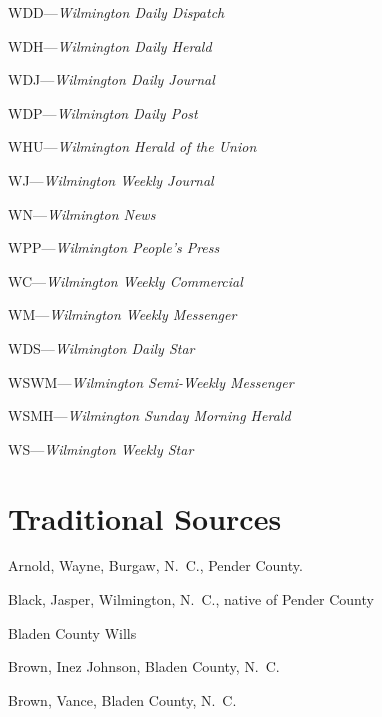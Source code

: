 \documentclass[11pt, a5paper, openright]{book}
\begin{document}
\begin{thebibliography}{99}
  WDD---\emph{Wilmington Daily Dispatch}

  WDH---\emph{Wilmington Daily Herald}

  WDJ---\emph{Wilmington Daily Journal}

  WDP---\emph{Wilmington Daily Post}

  WHU---\emph{Wilmington Herald of the Union}

  WJ---\emph{Wilmington Weekly Journal}

  WN---\emph{Wilmington News}

  WPP---\emph{Wilmington People's Press}

  WC---\emph{Wilmington Weekly Commercial}

  WM---\emph{Wilmington Weekly Messenger}

  WDS---\emph{Wilmington Daily Star}

  WSWM---\emph{Wilmington Semi-Weekly Messenger}

  WSMH---\emph{Wilmington Sunday Morning Herald}

  WS---\emph{Wilmington Weekly Star}

\section*{Traditional Sources}

  Arnold, Wayne, Burgaw, N.~C., Pender County.

  Black, Jasper, Wilmington, N.~C., native of Pender County

  Bladen County Wills

  Brown, Inez Johnson, Bladen County, N.~C.

  Brown, Vance, Bladen County, N.~C.


\end{thebibliography}
\end{document}
